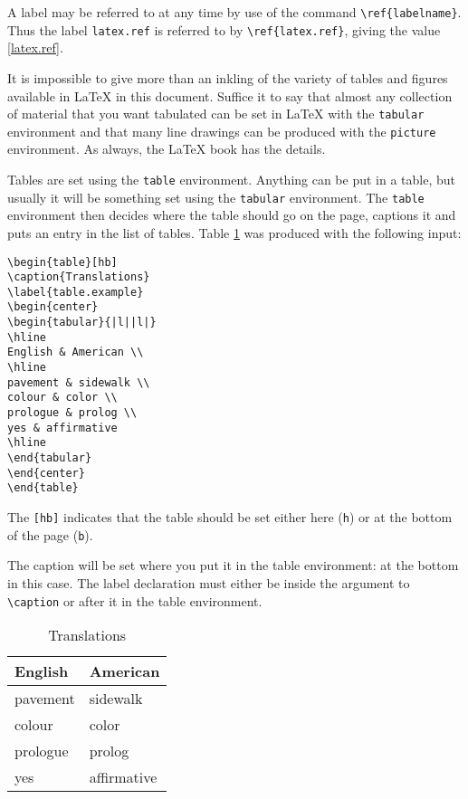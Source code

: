 A label may be referred to at any time by use of the command
\verb|\ref{labelname}|.
Thus the label \verb|latex.ref| is referred to by \verb|\ref{latex.ref}|,
giving the value \ref{latex.ref}.

It is impossible to give more than an inkling of the variety of tables and
figures available in LaTeX in this document.
Suffice it to say that almost any collection of material that you want
tabulated can be set in LaTeX with the \verb|tabular| environment and that
many line drawings can be produced with the \verb|picture| environment.
As always, the LaTeX book has the details.

Tables are set using the \verb|table| environment.
Anything can be put in a table, but usually it will be something set
using the \verb|tabular| environment.
The \verb|table| environment then decides where the table should go on the
page, captions it and puts an entry in the list of tables.
Table \ref{table.example} was produced with the following input:
\begin{verbatim}
\begin{table}[hb]
\caption{Translations}
\label{table.example}
\begin{center}
\begin{tabular}{|l||l|}
\hline
English & American \\
\hline
pavement & sidewalk \\
colour & color \\
prologue & prolog \\
yes & affirmative
\hline
\end{tabular}
\end{center}
\end{table}
\end{verbatim}

The \verb|[hb]| indicates that the table should be set either here
(\verb|h|) or at the bottom of the page (\verb|b|).

The caption will be set where you put it in the table environment: at the
bottom in this case.
The label declaration must either be inside the argument to \verb|\caption|
or after it in the table environment.

\begin{table}[hb]
\caption{Translations}
\label{table.example}
\begin{center}
\begin{tabular}{|l||l|}
\hline
English & American \\
\hline
pavement & sidewalk \\
colour & color \\
prologue & prolog \\
yes & affirmative \\
\hline
\end{tabular}
\end{center}
\end{table}


